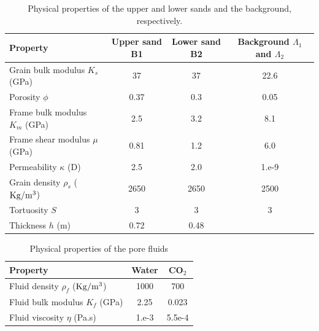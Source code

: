 \documentclass[draft]{agujournal2019}
\begin{document}
\begin{table}[!ht]
  \caption{Physical properties of the upper and lower sands and the background, respectively. }
\begin{center}
  \begin{tabular}{ | l  c  c c | }
    \hline
    Property & Upper sand B1 & Lower
     sand B2 & Background $\Lambda_1$ and $\Lambda_2$  \\ \hline
    Grain bulk modulus $K_s$ (\rm{GPa}) & 37 & 37 & 22.6 \\ 
    Porosity $\phi$ & 0.37 & 0.3 & 0.05  \\ 
    Frame bulk modulus $K_m$ (GPa) & 2.5  & 3.2 & 8.1\\ 
    Frame shear modulus $\mu$ (GPa) & 0.81  & 1.2 & 6.0 \\
    Permeability $\kappa$ (D) & 2.5 & 2.0 & 1.e-9 \\
    Grain density $\rho_s$ ($\rm{Kg/m^3}$) &2650 & 2650 & 2500\\ 
    Tortuosity $S$ & 3 & 3 & 3\\
    Thickness $h$ (m) & 0.72 & 0.48 & \\ 
                                       
    \hline
  \end{tabular}
  \label{table.1}
\end{center}
\end{table}

\begin{table}[!ht]
  \caption{Physical properties of the pore fluids}
\begin{center}
  \begin{tabular}{ | l | c | c |  }
    \hline
    Property & Water & CO$_2$\\ \hline
    Fluid density $\rho_f$ ($\rm{Kg/m^3}$) & 1000 & 700\\
    Fluid bulk modulus $K_f$ (\rm{GPa}) & 2.25 & 0.023\\
    Fluid viscosity $\eta$ (\rm{Pa.s})& 1.e-3 & 5.5e-4\\
    \hline
  \end{tabular}
  \label{table.2}
\end{center}
\end{table}
\end{document}

